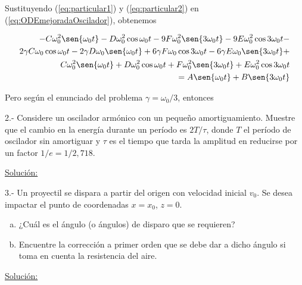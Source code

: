 \documentclass[a4paper,10pt]{article}
\begin{document}
Sustituyendo (\ref{eq:particular1}) y (\ref{eq:particular2}) en (\ref{eq:ODEmejoradaOscilador}),
obtenemos

\begin{align*}
%
 - C\omega_0^2 \sen{\omega_0t} - D\omega_0^2 \cos{\omega_0t} - 
  9F\omega_0^2 \sen{3 \omega_0t} - 9E\omega_0^2 \cos{3 \omega_0t} - \\
  2\gamma C \omega_0 \cos{\omega_0t} - 2\gamma D\omega_0 \sen{\omega_0t} + 
  6\gamma F\omega_0 \cos{3 \omega_0t} - 6\gamma E\omega_0 \sen{3 \omega_0t} + \\
  C\omega_0^2 \sen{\omega_0t} + D\omega_0^2 \cos{\omega_0t} + F\omega_0^2 
  \sen{3 \omega_0t} + E\omega_0^2 \cos{3 \omega_0t} \\
  = A \sen{\omega_0t} + B \sen{3\omega_0t}
\end{align*}

Pero según el enunciado del problema $\gamma = \omega_0/3$, entonces











\vspace{.3cm}

2.- Considere un oscilador armónico con un pequeño amortiguamiento.
Muestre que el cambio en la energía durante un período es $2T/\tau$,
donde $T$ el período de oscilador sin amortiguar y $\tau$ es el tiempo
que tarda la amplitud en reducirse por un factor $1/e=1/2,718$.

\vspace{.3cm}

\underline{Solución:}

\vspace{.3cm}

3.- Un proyectil se dispara a partir del origen con velocidad inicial $v_{0}$.
Se desea impactar el punto de coordenadas $x=x_{0}$, $z=0$.

\begin{enumerate}[a)]
 \item ¿Cuál es el ángulo (o ángulos) de disparo que se requieren?
 \item Encuentre la corrección a primer orden que se debe dar a dicho ángulo si toma 
 en cuenta la resistencia del aire.
\end{enumerate}
\vspace{.3cm}

\underline{Solución:}
\end{document}
